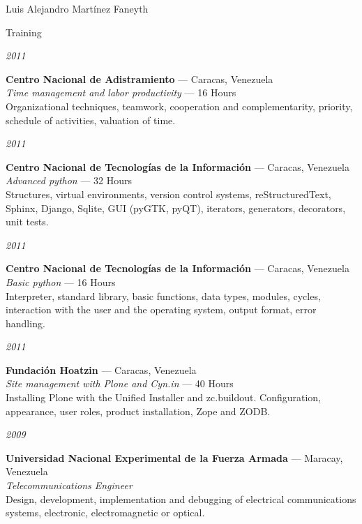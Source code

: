 \documentclass[10pt,letterpaper]{article}
\begin{document}
\begin{cv}{Luis Alejandro Mart\'inez Faneyth}
\begin{cvlist}{Training}
\item[{\parbox[t]{6em}{\textit{\large{2011}}}}]{
	\parbox[t]{\linewidth}{
		\textbf{Centro Nacional de Adistramiento} --- Caracas, Venezuela\\
		\textit{Time management and labor productivity} --- 16 Hours\\
		\footnotesize{Organizational techniques, teamwork, cooperation and complementarity, priority, schedule of activities, valuation of time.}
	}
}
\item[{\parbox[t]{6em}{\textit{\large{2011}}}}]{
	\parbox[t]{\linewidth}{
		\textbf{Centro Nacional de Tecnolog\'ias de la Informaci\'on} --- Caracas, Venezuela\\
		\textit{Advanced python} --- 32 Hours\\
		\footnotesize{Structures, virtual environments, version control systems, reStructuredText, Sphinx, Django, Sqlite, GUI (pyGTK, pyQT), iterators, generators, decorators, unit tests.}
	}
}
\item[{\parbox[t]{6em}{\textit{\large{2011}}}}]{
	\parbox[t]{\linewidth}{
		\textbf{Centro Nacional de Tecnolog\'ias de la Informaci\'on} --- Caracas, Venezuela\\
		\textit{Basic python} --- 16 Hours\\
		\footnotesize{Interpreter, standard library, basic functions, data types, modules, cycles, interaction with the user and the operating system, output format, error handling.}
	}
}
\item[{\parbox[t]{6em}{\textit{\large{2011}}}}]{
	\parbox[t]{\linewidth}{
		\textbf{Fundaci\'on Hoatzin} --- Caracas, Venezuela\\
		\textit{Site management with Plone and Cyn.in} --- 40 Hours\\
		\footnotesize{Installing Plone with the Unified Installer and zc.buildout. Configuration, appearance, user roles, product installation, Zope and ZODB.}
	}
}
\item[{\parbox[t]{6em}{\textit{\large{2009}}}}]{
	\parbox[t]{\linewidth}{
		\textbf{Universidad Nacional Experimental de la Fuerza Armada} --- Maracay, Venezuela\\
		\textit{Telecommunications Engineer}\\
		\footnotesize{Design, development, implementation and debugging of electrical communications systems, electronic, electromagnetic or optical.}
	}
}
\end{cvlist}


\end{cv}
\end{document}
